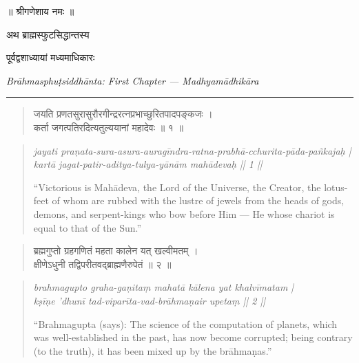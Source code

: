 \documentclass[11pt,a4paper]{article}
\newcommand{\dev}[1]{{\devanagarifont #1}}
\theoremstyle{definition}
\begin{document}
\begin{center}
{\Large\dev{॥ श्रीगणेशाय नमः ॥}}

\vspace{0.5cm}
{\Large\dev{अथ ब्राह्मस्फुटसिद्धान्तस्य}}

\vspace{0.3cm}
{\large\dev{पूर्वद्वशाध्यायां मध्यमाधिकारः}}

\vspace{0.5cm}
\textit{Br\=ahmasphu\d{t}siddh\=anta: First Chapter --- Madhyam\=adhik\=ara}
\end{center}

\vspace{0.8cm}

\noindent\rule{\textwidth}{1pt}

\vspace{0.5cm}



\noindent
\begin{quote}
\dev{जयति प्रणतसुरासुरौरगीन्द्ररत्नप्रभाच्छुरितपादपङ्कजः ।\\
कर्ता जगत्पतिरदित्यतुल्ययानां महादेवः ॥ १ ॥}
\end{quote}

\hfill\noindent
\begin{quote}
\textit{jayati pra\d{n}ata-sura-asura-aurag\={i}ndra-ratna-prabh\=a-cchurita-p\=ada-pa\~nkaja\d{h} |\\
kart\=a jagat-patir-aditya-tulya-y\=an\=am mah\=adeva\d{h} || 1 ||}

``Victorious is Mah\=adeva, the Lord of the Universe, the Creator, the lotus-feet of whom are rubbed with the lustre of jewels from the heads of gods, demons, and serpent-kings who bow before Him --- He whose chariot is equal to that of the Sun.''
\end{quote}



\vspace{0.3cm}



\noindent
\begin{quote}
\dev{ब्रह्मगुप्तो ग्रहगणितं महता कालेन यत् खल्वीमतम् ।\\
क्षीणेऽधुनी तद्विपरीतवद्ब्राह्मणैरुपेतं ॥ २ ॥}
\end{quote}

\hfill\noindent
\begin{quote}
\textit{brahmagupto graha-ga\d{n}ita\d{m} mahat\=a k\=alena yat khalv\={i}matam |\\
k\d{s}\={i}\d{n}e 'dhun\={i} tad-vipar\={i}ta-vad-br\=ahma\d{n}air upeta\d{m} || 2 ||}

``Brahmagupta (says): The science of the computation of planets, which was well-established in the past, has now become corrupted; being contrary (to the truth), it has been mixed up by the br\=ahma\d{n}as.''
\end{quote}
\end{document}
